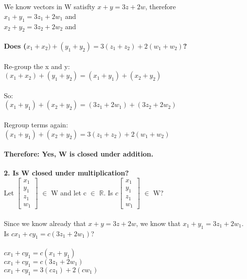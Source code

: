 \documentclass{article}
\begin{document}
{\\
\\
We know vectors in W satisfty $x+y = 3z+2w$, therefore\\
$x_{1}+y_{1} = 3z_{1}+2w_{1}$ and \\
$x_{2}+y_{2} = 3z_{2}+2w_{2}$ and \\
\\
\textbf{Does ($x_{1} + x_{2}) + (y_{1} + y_{2}) = 3(z_{1} + z{_2}) + 2(w_{1} + w_{2})$?}\\
\\
Re-group the x and y:\\
$ (x_{1} + x_{2}) + ( y_{1} + y_{2})  = (x_{1} + y_{1}) + (x_{2} + y_{2})$\\
\\
So:\\
$(x_{1} + y_{1}) + (x_{2} + y_{2}) =  (3z_{1}+2w_{1}) + (3z_{2}+2w_{2})$\\
\\
Regroup terms again:
\\
$(x_{1} + y_{1}) + (x_{2} + y_{2}) =  3(z_{1}+z_{2}) + 2(w_{1} + w_{2})$\\
\\
\textbf{Therefore: Yes, W is closed under addition.}\\
\\
\textbf{2. Is W closed under multiplication?}
\\
Let $\left[\begin{matrix}x_{1}\\y_{1}\\z{_1}\\w_{1}\end{matrix}\right]$ $\in$ W and let c $\in$ $\mathbb{R}$.  Is $c \left[\begin{matrix}x_{1}\\y_{1}\\z{_1}\\w_{1}\end{matrix}\right]$ $\in$ W?\\
\\
Since we know already that $x+y = 3z+2w$, we know that $x_{1}+y_{1} = 3z_{1}+2w_{1}$. \\
Is $cx_{1} + cy_{1} = c(3z_{1} + 2w_{1})$?\\
\\
$cx_{1} + cy_{1} = c(x_{1} + y_{1})$\\
$cx_{1} + cy_{1} = c(3z_{1} + 2w_{1})$\\
$cx_{1} + cy_{1} = 3(cz_{1}) + 2(cw_{1})$\\
}
\end{document}
